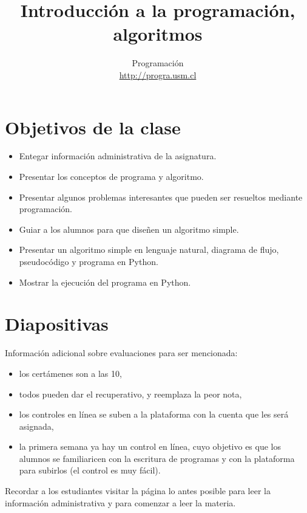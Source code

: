 \documentclass[10pt]{article}
\title{Introducción a la programación, algoritmos}
\author{Programación \\ \url{http://progra.usm.cl}}
\date{}
\begin{document}
  \maketitle

  \section*{Objetivos de la clase}
  \begin{itemize}
    \item Entegar información administrativa de la asignatura.
    \item Presentar los conceptos de programa y algoritmo.
    \item Presentar algunos problemas interesantes
      que pueden ser resueltos mediante programación.
    \item Guiar a los alumnos para que diseñen un algoritmo simple.
    \item Presentar un algoritmo simple en lenguaje natural,
      diagrama de flujo, pseudocódigo y programa en Python.
    \item Mostrar la ejecución del programa en Python.
  \end{itemize}

  \section*{Diapositivas}


  Información adicional sobre evaluaciones
  para ser mencionada:
  \begin{itemize}
    \item los certámenes son a las 10,
    \item todos pueden dar el recuperativo,
      y reemplaza la peor nota,
    \item los controles en línea
      se suben a la plataforma con la cuenta que les será asignada,
    \item la primera semana ya hay un control en línea,
      cuyo objetivo es que los alumnos se familiaricen
      con la escritura de programas
      y con la plataforma para subirlos
      (el control es muy fácil).
  \end{itemize}


  Recordar a los estudiantes
  visitar la página lo antes posible
  para leer la información administrativa
  y para comenzar a leer la materia.
  
\end{document}
